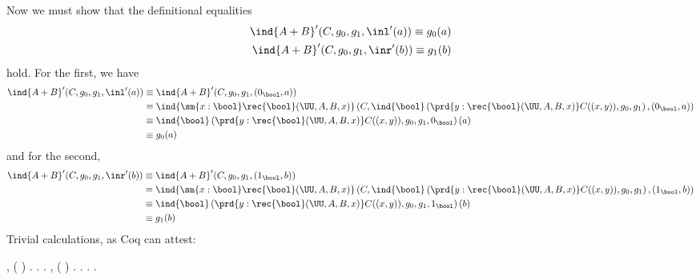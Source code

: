     Now we must show that the definitional equalities
    \begin{align*}
    \ind{A+B}'(C, g_{0}, g_{1}, \inl'(a)) \equiv g_{0}(a) \\
    \ind{A+B}'(C, g_{0}, g_{1}, \inr'(b)) \equiv g_{1}(b)
    \end{align*}
    hold.  For the first, we have
    \begin{align*}
    \ind{A+B}'(C, g_{0}, g_{1}, \inl'(a)) 
    &\equiv
    \ind{A+B}'(C, g_{0}, g_{1}, (0_{\bool}, a)) 
    \\&\equiv
    \ind{\sm{x:\bool}\rec{\bool}(\UU, A, B, x)}\left(
    C,
    \ind{\bool}\left(
    \prd{y:\rec{\bool}(\UU, A, B, x)} C((x, y)),
    g_{0},
    g_{1}
    \right),
    (0_{\bool}, a)
    \right)
    \\&\equiv
    \ind{\bool}\left(
    \prd{y:\rec{\bool}(\UU, A, B, x)} C((x, y)),
    g_{0},
    g_{1},
    0_{\bool}
    \right)(a)
    \\&\equiv
    g_{0}(a)
    \end{align*}
    and for the second,
    \begin{align*}
    \ind{A+B}'(C, g_{0}, g_{1}, \inr'(b)) 
    &\equiv
    \ind{A+B}'(C, g_{0}, g_{1}, (1_{\bool}, b)) 
    \\&\equiv
    \ind{\sm{x:\bool}\rec{\bool}(\UU, A, B, x)}\left(
    C,
    \ind{\bool}\left(
    \prd{y:\rec{\bool}(\UU, A, B, x)} C((x, y)),
    g_{0},
    g_{1}
    \right),
    (1_{\bool}, b)
    \right)
    \\&\equiv
    \ind{\bool}\left(
    \prd{y:\rec{\bool}(\UU, A, B, x)} C((x, y)),
    g_{0},
    g_{1},
    1_{\bool}
    \right)(b)
    \\&\equiv
    g_{1}(b)
    \end{align*}
    Trivial calculations, as Coq can attest: \begin{coqdoccode}
\coqdocemptyline
\coqdocindent{1.00em}
 \coqdockw{\ensuremath{\forall}}    ,     ( ) \coqdocnotation{=}  . . .\coqdoceol
\coqdocemptyline
\coqdocindent{1.00em}
 \coqdockw{\ensuremath{\forall}}    ,     ( ) \coqdocnotation{=}  . . .\coqdoceol
\coqdocemptyline
\coqdocnoindent
{} .\coqdoceol
\coqdocemptyline
\end{coqdoccode}
